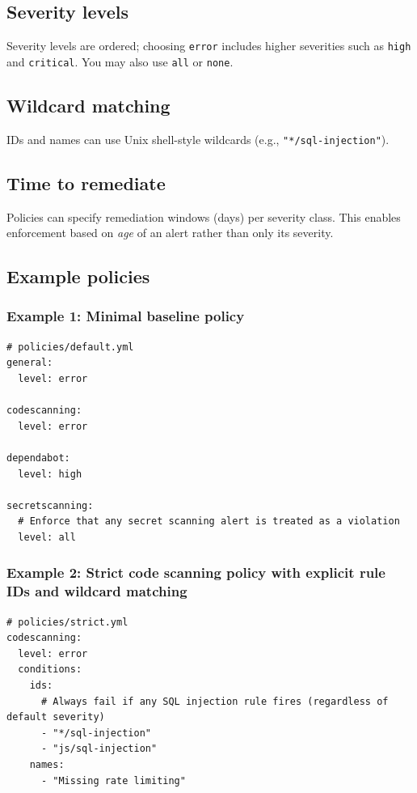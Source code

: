 \documentclass[11pt]{article}
\renewcommand{\cmd}[1]{\texttt{#1}}
\begin{document}
\subsection{Severity levels}

Severity levels are ordered; choosing \cmd{error} includes higher severities such as \cmd{high} and \cmd{critical}. You may also use \cmd{all} or \cmd{none}.

\subsection{Wildcard matching}

IDs and names can use Unix shell-style wildcards (e.g., \cmd{"*/sql-injection"}).

\subsection{Time to remediate}

Policies can specify remediation windows (days) per severity class. This enables enforcement based on \textit{age} of an alert rather than only its severity.

\subsection{Example policies}

\subsubsection{Example 1: Minimal baseline policy}

\begin{verbatim}
# policies/default.yml
general:
  level: error

codescanning:
  level: error

dependabot:
  level: high

secretscanning:
  # Enforce that any secret scanning alert is treated as a violation
  level: all
\end{verbatim}

\subsubsection{Example 2: Strict code scanning policy with explicit rule IDs and wildcard matching}

\begin{verbatim}
# policies/strict.yml
codescanning:
  level: error
  conditions:
    ids:
      # Always fail if any SQL injection rule fires (regardless of default severity)
      - "*/sql-injection"
      - "js/sql-injection"
    names:
      - "Missing rate limiting"
\end{verbatim}
\end{document}
